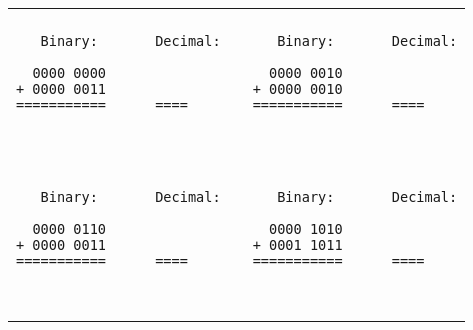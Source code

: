 \begin{tabular}{p{3in} | c  p{3in} }
\hline
\\
\begin{minipage}{2.95in}
\begin{verbatim}
   Binary:       Decimal:

  0000 0000      
+ 0000 0011      
===========      ====

___________      ____
\end{verbatim}
\end{minipage}

&&

\begin{minipage}{2.95in}
\begin{verbatim}
   Binary:       Decimal:

  0000 0010      
+ 0000 0010      
===========      ====

___________      ____
\end{verbatim}
\end{minipage}

\\
\hline
\\

\begin{minipage}{2.95in}
\begin{verbatim}
   Binary:       Decimal:

  0000 0110      
+ 0000 0011      
===========      ====

___________      ____
\end{verbatim}
\end{minipage}

&&

\begin{minipage}{2.95in}
\begin{verbatim}
   Binary:       Decimal:

  0000 1010      
+ 0001 1011      
===========      ====

___________      ____
\end{verbatim}
\end{minipage}

\\
\hline
\end{tabular}



